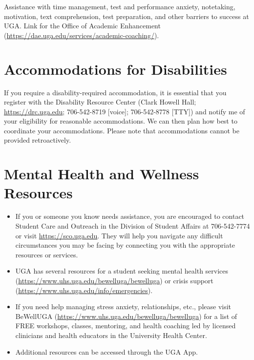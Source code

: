 \documentclass[12pt]{article}
\begin{document}
Assistance with time management, test and performance anxiety,
notetaking, motivation, text comprehension, test preparation, and
other barriers to success at UGA. Link for the Office of Academic
Enhancement (\url{https://dae.uga.edu/services/academic-coaching/}). 

\vspace{-2mm}
\section*{\normalsize Accommodations for Disabilities}
\vspace{-4mm}

If you require a disability-required accommodation, it is essential
that you register with the Disability Resource Center (Clark Howell
Hall; \url{https://drc.uga.edu}; 706-542-8719 [voice]; 706-542-8778 [TTY])
and notify me of your eligibility for reasonable accommodations. We
can then plan how best to coordinate your accommodations. Please note
that accommodations cannot be provided retroactively.



\vspace{-2mm}
\section*{\normalsize Mental Health and Wellness Resources}
\vspace{-4mm}

\begin{itemize}
  \item If you or someone you know needs assistance, you are
    encouraged to contact Student Care and Outreach in the Division of
    Student Affairs at 706-542-7774 or visit \url{https://sco.uga.edu}. They
    will help you navigate any difficult circumstances you may be facing
    by connecting you with the appropriate resources or services.
  \item UGA has several resources for a student seeking mental health
    services (\url{https://www.uhs.uga.edu/bewelluga/bewelluga}) or crisis
    support (\url{https://www.uhs.uga.edu/info/emergencies}).
  \item If you need help managing stress anxiety, relationships, etc.,
    please visit BeWellUGA (\url{https://www.uhs.uga.edu/bewelluga/bewelluga})
    for a list of FREE workshops, classes, mentoring, and health
    coaching led by licensed clinicians and health educators in the
    University Health Center.
  \item Additional resources can be accessed through the UGA App.
\end{itemize}
\end{document}
